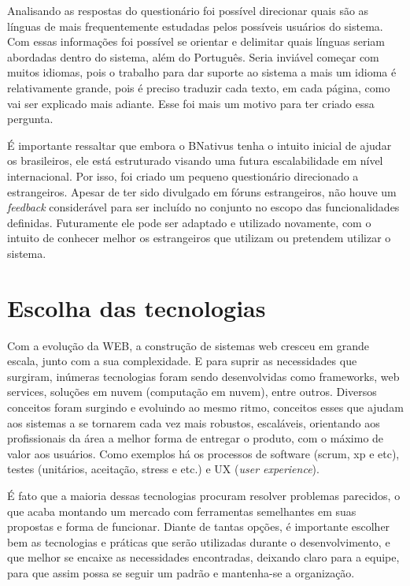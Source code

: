 Analisando as respostas do questionário foi possível direcionar quais são as línguas de mais frequentemente estudadas pelos possíveis usuários do sistema. Com essas informações foi possível se orientar e delimitar quais línguas seriam abordadas dentro do sistema, além do Português. Seria inviável começar com muitos idiomas, pois o trabalho para dar suporte ao sistema a mais um idioma é relativamente grande, pois é preciso traduzir cada texto, em cada página, como vai ser explicado mais adiante. Esse foi mais um motivo para ter criado essa pergunta. 

É importante ressaltar que embora o BNativus tenha o  intuito inicial de ajudar os brasileiros, ele está estruturado visando uma futura escalabilidade em nível internacional. Por isso, foi criado um pequeno questionário direcionado a estrangeiros. Apesar de ter sido divulgado em fóruns estrangeiros, não houve um \textit{feedback} considerável para ser incluído no conjunto no escopo das funcionalidades definidas. Futuramente ele pode ser adaptado e utilizado novamente, com o intuito de conhecer melhor os estrangeiros que utilizam ou pretendem utilizar o sistema.

\section{Escolha das tecnologias}

Com a evolução da WEB, a construção de sistemas web cresceu em grande escala, junto com a sua complexidade. E para suprir as necessidades que surgiram, inúmeras tecnologias foram sendo desenvolvidas como frameworks, web services, soluções em nuvem (computação em nuvem), entre outros. Diversos conceitos foram surgindo e evoluindo ao mesmo ritmo, conceitos esses que ajudam aos sistemas a se tornarem cada vez mais robustos, escaláveis, orientando aos profissionais da área a melhor forma de entregar o produto, com o máximo de valor aos usuários. Como exemplos há os processos de software (scrum, xp e etc), testes (unitários, aceitação, stress e etc.) e UX (\textit{user experience}). 

É fato que a maioria dessas tecnologias procuram resolver problemas parecidos, o que acaba montando um mercado com ferramentas semelhantes em suas propostas e forma de funcionar. Diante de tantas opções, é importante escolher bem as tecnologias e práticas que serão utilizadas durante o desenvolvimento, e que melhor se encaixe as necessidades encontradas, deixando claro para a equipe, para que assim possa se seguir um padrão e mantenha-se a organização. 

